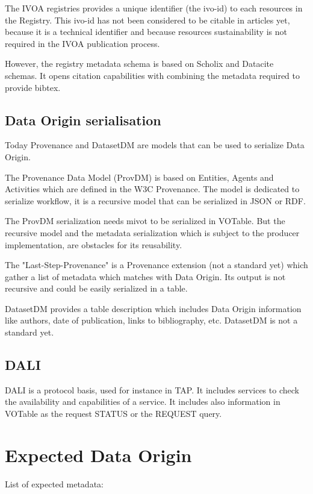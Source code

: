 \documentclass[11pt,a4paper]{ivoa}
\begin{document}
The IVOA registries provides a unique identifier (the ivo-id) to each resources in the Registry. This ivo-id has not been considered to be citable in articles yet, because it is a technical identifier and because resources sustainability is not required in the IVOA publication process.

However, the registry metadata schema is based on Scholix and Datacite schemas. It opens citation capabilities with combining the metadata required to provide bibtex.

\subsection{Data Origin serialisation}
Today Provenance and DatasetDM are models that can be used to serialize Data Origin.

The Provenance Data Model (ProvDM) is based on Entities, Agents and Activities which are defined in the W3C Provenance. The model is dedicated to serialize workflow,
it is a recursive model that can be serialized in JSON or RDF. 

The ProvDM serialization needs mivot to be serialized in VOTable. But the recursive model and the metadata serialization which is subject to the producer implementation, are obstacles for its reusability.


The "Last-Step-Provenance" is a Provenance extension (not a standard yet) which gather a list of metadata which matches with Data Origin. Its output is not recursive and could be easily serialized in a table.


DatasetDM provides a table description which includes Data Origin information like authors, date of publication, links to bibliography, etc.
DatasetDM is not a standard yet.

\subsection{DALI}
DALI is a protocol basis, used for instance in TAP. It includes services to  check the availability and capabilities of a service. It includes also information in VOTable as the request STATUS or the REQUEST query.


\section{Expected Data Origin}

List of expected metadata:
\end{document}

